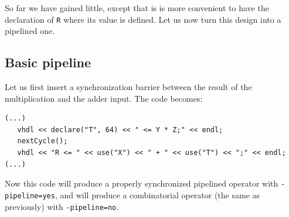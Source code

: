 \documentclass{article}
\begin{document}
So far we have gained little, except that is is more convenient to
have the declaration of \verb!R! where its value is defined. Let us
now turn this design into a pipelined one.


\subsection{Basic pipeline}


Let us first insert a synchronization barrier between the result of the multiplication and the adder input. The code becomes: 

\begin{verbatim}
(...)
   vhdl << declare("T", 64) << " <= Y * Z;" << endl;
   nextCycle();
   vhdl << "R <= " << use("X") << " + " << use("T") << ";" << endl;
(...)
\end{verbatim}

Now this code will produce a properly synchronized pipelined operator
with \verb!-pipeline=yes!, and will produce a combinatorial operator
(the same as previously) with \verb!-pipeline=no!.
\end{document}
